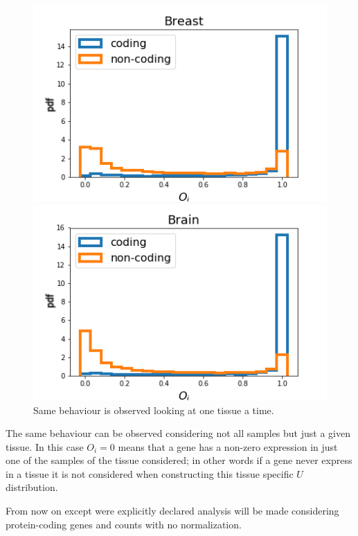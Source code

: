 \begin{figure}[htb!]
    \centering
    \begin{minipage}{0.45\textwidth}
    \includegraphics[width=0.95\linewidth]{pictures/structure/gtex/U_Breast.png}
    \end{minipage}
    \hspace{2mm}
    \begin{minipage}{0.45\textwidth}
    \includegraphics[width=0.95\linewidth]{pictures/structure/gtex/U_Brain.png}
    \end{minipage}
    \caption{Same behaviour is observed looking at one tissue a time.}
    \label{fig:structure/gtex/U_tissues}
\end{figure}

The same behaviour can be observed considering not all samples but just a given tissue. In this case $O_i=0$ means that a gene has a non-zero expression in just one of the samples of the tissue considered; in other words if a gene never express in a tissue it is not considered when constructing this tissue specific $U$ distribution.

From now on except were explicitly declared analysis will be made considering protein-coding genes and counts with no normalization.